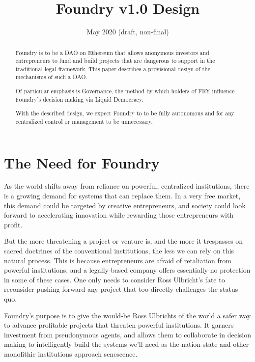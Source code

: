 \documentclass{article}
\title{Foundry v1.0 Design}
\date{May 2020 (draft, non-final)}
\begin{document}

\maketitle
\begin{abstract}
	\setlength{\parskip}{1em}
	Foundry is to be a DAO on Ethereum that allows anonymous investors and entrepreneurs to fund and build projects that are dangerous to support in the traditional legal framework. This paper describes a provisional design of the mechanisms of such a DAO.
	
	Of particular emphasis is Governance, the method by which holders of FRY influence Foundry's decision making via Liquid Democracy.
	
	With the described design, we expect Foundry to to be fully autonomous and for any centralized control or management to be unnecessary.
\end{abstract}

\newpage
{}
\tableofcontents

\setlength{\parskip}{0.5em}

\newpage
{}
\section{The Need for Foundry} \label{need}

As the world shifts away from reliance on powerful, centralized institutions, there is a growing demand for systems that can replace them. In a very free market, this demand could be targeted by creative entrepreneurs, and society could look forward to accelerating innovation while rewarding those entrepreneurs with profit.

But the more threatening a project or venture is, and the more it trespasses on sacred doctrines of the conventional institutions, the less we can rely on this natural process. This is because entrepreneurs are afraid of retaliation from powerful institutions, and a legally-based company offers essentially no protection in some of these cases. One only needs to consider Ross Ulbricht's fate to reconsider pushing forward any project that too directly challenges the status quo.

Foundry's purpose is to give the would-be Ross Ulbrichts of the world a safer way to advance profitable projects that threaten powerful institutions. It garners investment from pseudonymous agents, and allows them to collaborate in decision making to intelligently build the systems we'll need as the nation-state and other monolithic institutions approach senescence.
\end{document}
